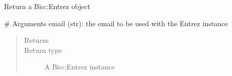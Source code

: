 \documentclass[letterpaper,10pt,english]{sphinxmanual}
\begin{document}
\begin{fulllineitems}
\label{\detokenize{omicidx.geometa:omicidx.geometa.get_entrez_instance}}
Return a Bio::Entrez object

\# Arguments
email (str): the email to be used with the Entrez instance
\begin{quote}\begin{description}
\item[{Returns}] \leavevmode


\item[{Return type}] \leavevmode
A Bio::Entrez instance

\end{description}\end{quote}

\end{fulllineitems}

\end{document}
